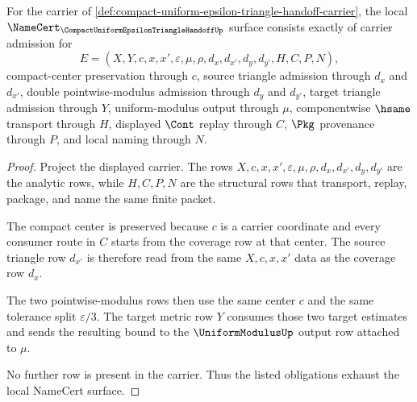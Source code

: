 
\begin{theorem}
\label{thm:compact-uniform-epsilon-triangle-handoff-namecert-obligations}
For the carrier of \autoref{def:compact-uniform-epsilon-triangle-handoff-carrier}, the local $\NameCert_{\CompactUniformEpsilonTriangleHandoffUp}$ surface consists exactly of carrier admission for
$$
E=(X,Y,c,x,x',\varepsilon,\mu,\rho,d_x,d_{x'},d_y,d_{y'},H,C,P,N),
$$
compact-center preservation through $c$, source triangle admission through $d_x$ and $d_{x'}$, double pointwise-modulus admission through $d_y$ and $d_{y'}$, target triangle admission through $Y$, uniform-modulus output through $\mu$, componentwise $\hsame$ transport through $H$, displayed $\Cont$ replay through $C$, $\Pkg$ provenance through $P$, and local naming through $N$.
\end{theorem}
\begin{proof}
Project the displayed carrier. The rows $X,c,x,x',\varepsilon,\mu,\rho,d_x,d_{x'},d_y,d_{y'}$ are the analytic rows, while $H,C,P,N$ are the structural rows that transport, replay, package, and name the same finite packet.

The compact center is preserved because $c$ is a carrier coordinate and every consumer route in $C$ starts from the coverage row at that center. The source triangle row $d_{x'}$ is therefore read from the same $X,c,x,x'$ data as the coverage row $d_x$.

The two pointwise-modulus rows then use the same center $c$ and the same tolerance split $\varepsilon/3$. The target metric row $Y$ consumes those two target estimates and sends the resulting bound to the $\UniformModulusUp$ output row attached to $\mu$.

No further row is present in the carrier. Thus the listed obligations exhaust the local NameCert surface.
\end{proof}

